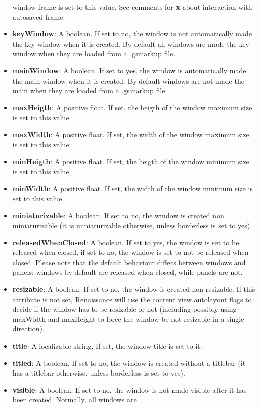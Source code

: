 \begin{itemize}
  window frame is set to this value.  See comments for {\bf x} about
  interaction with autosaved frame.
\item {\bf keyWindow}: A boolean.  If set to no, the window is not
  automatically made the key window when it is created.  By default
  all windows are made the key window when they are loaded from a
  .gsmarkup file.
\item {\bf mainWindow}: A boolean.  If set to yes, the window is
  automatically made the main window when it is created.  By default
  windows are not made the main when they are loaded from a .gsmarkup
  file.
\item {\bf maxHeigth}: A positive float.  If set, the heigth of the
  window maximum size is set to this value.
\item {\bf maxWidth}: A positive float.  If set, the width of the
  window maximum size is set to this value.
\item {\bf minHeigth}: A positive float.  If set, the heigth of the
  window minimum size is set to this value.
\item {\bf minWidth}: A positive float.  If set, the width of the
  window minimum size is set to this value.
\item {\bf miniaturizable}: A boolean.  If set to no, the window is
  created non miniaturizable (it is miniaturizable otherwise, unless
  borderless is set to yes).
\item {\bf releasedWhenClosed}: A boolean.  If set to yes, the window
  is set to be released when closed, if set to no, the window is set
  to not be released when closed.  Please note that the default
  behaviour differs between windows and panels: windows by default are
  released when closed, while panels are not.
\item {\bf resizable}: A boolean.  If set to no, the window is created
  non resizable.  If this attribute is not set, Renaissance will use
  the content view autolayout flags to decide if the window has to be
  resizable or not (including possibly using maxWidth and maxHeight to
  force the window be not resizable in a single direction).
\item {\bf title}: A localizable string.  If set, the window title is
  set to it.
\item {\bf titled}: A boolean.  If set to no, the window is created
  without a titlebar (it has a titlebar otherwise, unless borderless
  is set to yes).
\item {\bf visible}: A boolean.  If set to no, the window is not made
  visible after it has been created.  Normally, all windows are

\end{itemize}

